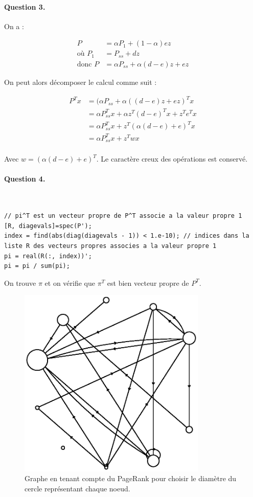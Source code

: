 \documentclass[12pt,a4paper]{article}
\begin{document}
\paragraph*{Question 3.} On a :

\begin{align*}
	P &= \alpha P_1 + (1 - \alpha) e z \\
	\text{o\`u } P_1 &= P_{ss} + dz \\
	\text{donc } P &= \alpha P_{ss} + \alpha (d - e) z + e z
\end{align*}

On peut alors décomposer le calcul comme suit :

\begin{align*}
P^T x
&= (\alpha P_{ss} + \alpha ((d - e) z + ez)^T x \\
&= \alpha P_{ss}^T x + \alpha z^T (d - e)^T x + z^T e^T x \\
&= \alpha P_{ss}^T x + z^T (\alpha (d - e) + e)^T x \\
&= \alpha P_{ss}^T x + z^T w x \\
\end{align*}

Avec $w = (\alpha (d - e) + e)^T$. Le caractère creux des opérations est conservé.

\paragraph*{Question 4.}
~
\begin{lstlisting}
// pi^T est un vecteur propre de P^T associe a la valeur propre 1
[R, diagevals]=spec(P');
index = find(abs(diag(diagevals - 1)) < 1.e-10); // indices dans la liste R des vecteurs propres associes a la valeur propre 1
pi = real(R(:, index))';
pi = pi / sum(pi);
\end{lstlisting}

On trouve $\pi$ et on vérifie que $\pi^T$ est bien vecteur propre de $P^T$.

\begin{figure}[H]
    \centering
    \includegraphics[width=0.8\textwidth]{q4.eps}
    \caption{Graphe en tenant compte du PageRank pour choisir le diamètre du cercle représentant chaque noeud.}
\end{figure}
\end{document}
